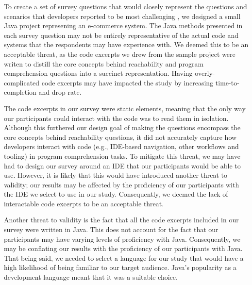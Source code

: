 \par To create a set of survey questions that would closely represent the
questions and scenarios that developers reported to be most challenging
\cite{latoza-2010-hard-questions, latoza-2010-reach}, we designed a small Java
project represening an e-commerce system.
The Java methods presented in each survey question may not be entirely
representative of the actual code and systems that the respondents may have
experience with.
We deemed this to be an acceptable threat, as the code excerpts we drew from
the sample project were writen to distill the core concepts behind
reachability and program comprehension questions into a succinct representation.
Having overly-complicated code excerpts may have impacted the study by
increasing time-to-completion and drop rate.

\par The code excerpts in our survey were static elements, meaning that the
only way our participants could interact with the code was to read them
in isolation.
Although this furthered our design goal of making the questions encompass
the core concepts behind reachability questions, it did not accurately
capture how developers interact with code (e.g., IDE-based navigation, 
other workflows and tooling) in program comprehension tasks.
To mitigate this threat, we may have had to design our survey around an IDE 
that our participants would be able to use.
However, it is likely that this would have introduced another threat to
validity; our results may be affected by the proficiency of our participants
with the IDE we select to use in our study.
Consequently, we deemed the lack of interactable code excerpts to be an 
acceptable threat.

\par Another threat to validity is the fact that all the code
excerpts included in our survey were written in Java.
This does not account for the fact that our participants may have varying
levels of proficiency with Java.
Consequently, we may be conflating our results with the proficiency of our
participants with Java.
That being said, we needed to select a language for our study that would
have a high likelihood of being familiar to our target audience.
Java's popularity as a development language 
\cite{so-2021-dev-survey, jetbrains-2021-dev-survey} meant that it was a 
suitable choice.

\endinput

